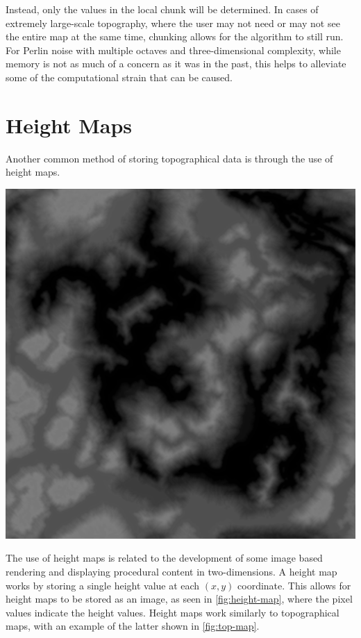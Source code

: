 \documentclass[10pt]{report}
\begin{document}
		Instead, only the values in the local chunk will be determined. In cases of extremely large-scale topography, where the user may not need or may not see the entire map at the same time, chunking allows for the algorithm to still run. For Perlin noise with multiple octaves and three-dimensional complexity, while memory is not as much of a concern as it was in the past, this helps to alleviate some of the computational strain that can be caused. 
		
		\section{Height Maps}
		
		Another common method of storing topographical data is through the use of height maps. 
		
		\begin{minipage}{\textwidth}
			\centering
			\includegraphics[scale=.4]{D10}
			\label{fig:height-map}
		\end{minipage}
		
		The use of height maps is related to the development of some image based rendering and displaying procedural content in two-dimensions. A height map works by storing a single height value at each \((x,y)\) coordinate. This allows for height maps to be stored as an image, as seen in \autoref{fig:height-map}, where the pixel values indicate the height values. Height maps work similarly to topographical maps, with an example of the latter shown in \autoref{fig:top-map}.
		
\end{document}
